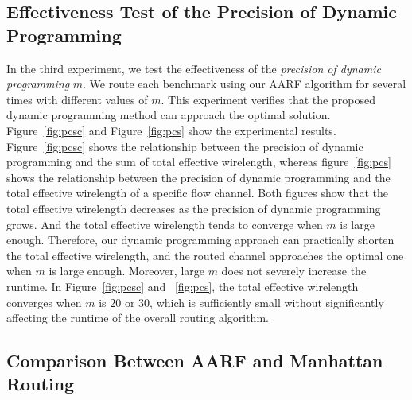 \documentclass[journal]{IEEEtran}
\begin{document}
\subsection{Effectiveness Test of the Precision of Dynamic Programming}

In the third experiment, we test the effectiveness of the {\em precision of dynamic programming} $m$. We route each benchmark using our AARF algorithm for several times with different values of $m$. 
This experiment verifies that the proposed dynamic programming method can approach the optimal solution. 
Figure~\ref{fig:pcsc} and Figure~\ref{fig:pcs} show the experimental results. Figure~\ref{fig:pcsc} shows the relationship between the precision of dynamic programming and the sum of total effective wirelength, whereas figure~\ref{fig:pcs} shows the relationship between the precision of dynamic programming and the total effective wirelength of a specific flow channel.
Both figures show that the total effective wirelength decreases as the precision of dynamic programming grows. And the total effective wirelength tends to converge when $m$ is large enough. 
Therefore, our dynamic programming approach can practically shorten the total effective wirelength, and the routed channel approaches the optimal one when $m$ is large enough. 
Moreover, large $m$ does not severely increase the runtime.
In Figure~\ref{fig:pcsc} and ~\ref{fig:pcs}, the total effective wirelength converges when $m$ is $20$ or $30$, which is sufficiently small without significantly affecting the runtime of the overall routing algorithm.

\subsection{Comparison Between AARF and Manhattan Routing}
\end{document}
